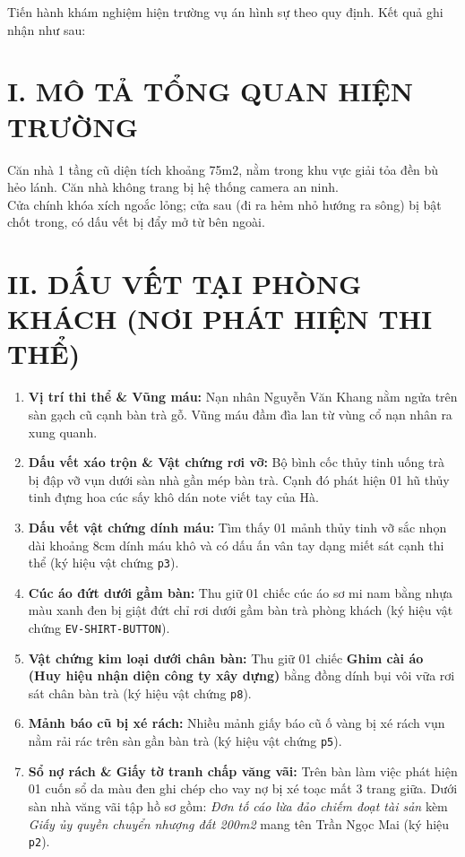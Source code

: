 \documentclass[12pt,a4paper]{article}
\begin{document}
\noindent Tiến hành khám nghiệm hiện trường vụ án hình sự theo quy định. Kết quả ghi nhận như sau:

\section*{I. MÔ TẢ TỔNG QUAN HIỆN TRƯỜNG}
Căn nhà 1 tầng cũ diện tích khoảng 75m2, nằm trong khu vực giải tỏa đền bù hẻo lánh. Căn nhà không trang bị hệ thống camera an ninh.\\
Cửa chính khóa xích ngoắc lỏng; cửa sau (đi ra hẻm nhỏ hướng ra sông) bị bật chốt trong, có dấu vết bị đẩy mở từ bên ngoài.

\section*{II. DẤU VẾT TẠI PHÒNG KHÁCH (NƠI PHÁT HIỆN THI THỂ)}
\begin{enumerate}[label=\arabic*., leftmargin=1.5cm]
    \item \textbf{Vị trí thi thể \& Vũng máu:} Nạn nhân Nguyễn Văn Khang nằm ngửa trên sàn gạch cũ cạnh bàn trà gỗ. Vũng máu đầm đìa lan từ vùng cổ nạn nhân ra xung quanh.
    \item \textbf{Dấu vết xáo trộn \& Vật chứng rơi vỡ:} Bộ bình cốc thủy tinh uống trà bị đập vỡ vụn dưới sàn nhà gần mép bàn trà. Cạnh đó phát hiện 01 hũ thủy tinh đựng hoa cúc sấy khô dán note viết tay của Hà.
    \item \textbf{Dấu vết vật chứng dính máu:} Tìm thấy 01 mảnh thủy tinh vỡ sắc nhọn dài khoảng 8cm dính máu khô và có dấu ấn vân tay dạng miết sát cạnh thi thể (ký hiệu vật chứng \texttt{p3}).
    \item \textbf{Cúc áo đứt dưới gầm bàn:} Thu giữ 01 chiếc cúc áo sơ mi nam bằng nhựa màu xanh đen bị giật đứt chỉ rơi dưới gầm bàn trà phòng khách (ký hiệu vật chứng \texttt{EV-SHIRT-BUTTON}).
    \item \textbf{Vật chứng kim loại dưới chân bàn:} Thu giữ 01 chiếc \textbf{Ghim cài áo (Huy hiệu nhận diện công ty xây dựng)} bằng đồng dính bụi vôi vữa rơi sát chân bàn trà (ký hiệu vật chứng \texttt{p8}).
    \item \textbf{Mảnh báo cũ bị xé rách:} Nhiều mảnh giấy báo cũ ố vàng bị xé rách vụn nằm rải rác trên sàn gần bàn trà (ký hiệu vật chứng \texttt{p5}).
    \item \textbf{Sổ nợ rách \& Giấy tờ tranh chấp văng vãi:} Trên bàn làm việc phát hiện 01 cuốn sổ da màu đen ghi chép cho vay nợ bị xé toạc mất 3 trang giữa. Dưới sàn nhà văng vãi tập hồ sơ gồm: \textit{Đơn tố cáo lừa đảo chiếm đoạt tài sản} kèm \textit{Giấy ủy quyền chuyển nhượng đất 200m2} mang tên Trần Ngọc Mai (ký hiệu \texttt{p2}).
\end{enumerate}
\end{document}
